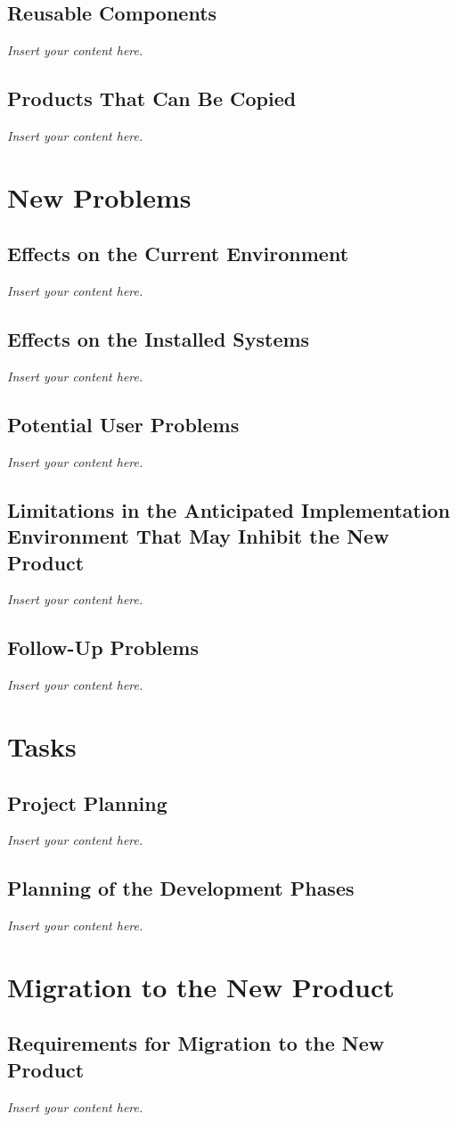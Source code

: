 \documentclass[12pt]{article}
\newcommand{\lips}{\textit{Insert your content here.}}
\begin{document}
\subsection{Reusable Components}
\lips
\subsection{Products That Can Be Copied}
\lips

\section{New Problems}
\subsection{Effects on the Current Environment}
\lips
\subsection{Effects on the Installed Systems}
\lips
\subsection{Potential User Problems}
\lips
\subsection{Limitations in the Anticipated Implementation Environment That May
Inhibit the New Product}
\lips
\subsection{Follow-Up Problems}
\lips

\section{Tasks}
\subsection{Project Planning}
\lips
\subsection{Planning of the Development Phases}
\lips

\section{Migration to the New Product}
\subsection{Requirements for Migration to the New Product}
\lips
\end{document}
